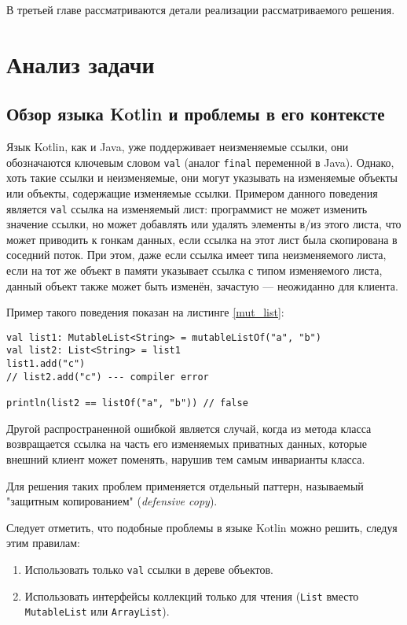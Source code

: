 \documentclass[specification,annotation,times]{itmo-student-thesis}
\begin{document}
В третьей главе рассматриваются детали реализации рассматриваемого решения.


\chapter{Анализ задачи}

\section{Обзор языка Kotlin и проблемы в его контексте}\label{existing_kotlin}

Язык Kotlin, как и Java, уже поддерживает неизменяемые ссылки, они обозначаются ключевым словом \texttt{val} (аналог \texttt{final} переменной в Java\cite{jvm8-spec}). 
Однако, хоть такие ссылки и неизменяемые, они могут указывать на изменяемые объекты или объекты, содержащие изменяемые ссылки.
Примером данного поведения является \texttt{val} ссылка на изменяемый лист: программист не может изменить значение ссылки, но может добавлять или удалять элементы в/из этого листа, что может приводить к гонкам данных, если ссылка на этот лист была скопирована в соседний поток.
При этом, даже если ссылка имеет типа неизменяемого листа, если на тот же объект в памяти указывает ссылка с типом изменяемого листа, данный объект также может быть изменён, зачастую --- неожиданно для клиента.

Пример такого поведения показан на листинге \ref{mut_list}:

\begin{lstlisting}[float=h!,caption={Один лист с разными типами ссылок},label={mut_list}]
val list1: MutableList<String> = mutableListOf("a", "b")
val list2: List<String> = list1
list1.add("c")
// list2.add("c") --- compiler error

println(list2 == listOf("a", "b")) // false
\end{lstlisting}

Другой распространенной ошибкой является случай, когда из метода класса возвращается ссылка на часть его изменяемых приватных данных, которые внешний клиент может поменять, нарушив тем самым инварианты класса.

Для решения таких проблем применяется отдельный паттерн, называемый "защитным копированием" (\textit{defensive copy}).

Следует отметить, что подобные проблемы в языке Kotlin можно решить, следуя этим правилам:

\begin{enumerate}
	\item Использовать только \texttt{val} ссылки в дереве объектов.
	\item Использовать интерфейсы коллекций только для чтения (\texttt{List} вместо \texttt{MutableList} или \texttt{ArrayList}).
\end{enumerate}
\end{document}
